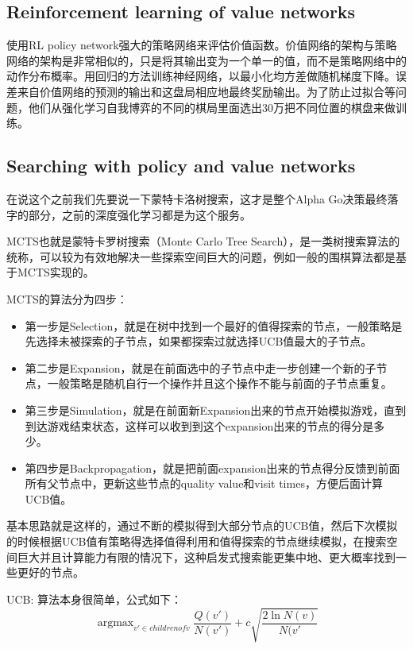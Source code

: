 \documentclass[12pt]{article}
\begin{document}
\subsection{Reinforcement learning of value networks}
使用RL policy network强大的策略网络来评估价值函数。价值网络的架构与策略网络的架构是非常相似的，只是将其输出变为一个单一的值，而不是策略网络中的动作分布概率。用回归的方法训练神经网络，以最小化均方差做随机梯度下降。误差来自价值网络的预测的输出和这盘局相应地最终奖励输出。为了防止过拟合等问题，他们从强化学习自我博弈的不同的棋局里面选出30万把不同位置的棋盘来做训练。

\subsection{Searching with policy and value networks}
在说这个之前我们先要说一下蒙特卡洛树搜索，这才是整个Alpha Go决策最终落字的部分，之前的深度强化学习都是为这个服务。

MCTS也就是蒙特卡罗树搜索（Monte Carlo Tree Search），是一类树搜索算法的统称，可以较为有效地解决一些探索空间巨大的问题，例如一般的围棋算法都是基于MCTS实现的。

MCTS的算法分为四步：
\begin{itemize}[itemindent=2em]
    \item 第一步是Selection，就是在树中找到一个最好的值得探索的节点，一般策略是先选择未被探索的子节点，如果都探索过就选择UCB值最大的子节点。
    
    \item 第二步是Expansion，就是在前面选中的子节点中走一步创建一个新的子节点，一般策略是随机自行一个操作并且这个操作不能与前面的子节点重复。
    
    \item 第三步是Simulation，就是在前面新Expansion出来的节点开始模拟游戏，直到到达游戏结束状态，这样可以收到到这个expansion出来的节点的得分是多少。
    
    \item 第四步是Backpropagation，就是把前面expansion出来的节点得分反馈到前面所有父节点中，更新这些节点的quality value和visit times，方便后面计算UCB值。
\end{itemize}

基本思路就是这样的，通过不断的模拟得到大部分节点的UCB值，然后下次模拟的时候根据UCB值有策略得选择值得利用和值得探索的节点继续模拟，在搜索空间巨大并且计算能力有限的情况下，这种启发式搜索能更集中地、更大概率找到一些更好的节点。

UCB: 算法本身很简单，公式如下：
$$
 \mathop{\arg\max}_{v' \in children of v} \frac{Q(v')}{N(v')} + c \sqrt{\frac{2\ln{N(v)}}{N(v'}}
$$
\end{document}
